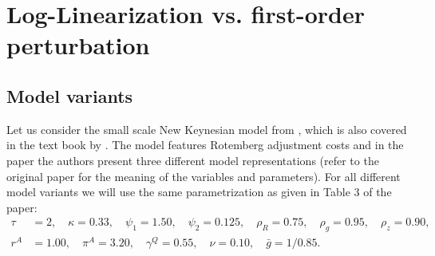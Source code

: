 \section{Log-Linearization vs. first-order perturbation\label{ex:LogLinearization}}

\subsection*{Model variants}
Let us consider the small scale New Keynesian model from \textcite{An.Schorfheide_2007_BayesianAnalysisDSGE},
  which is also covered in the text book by \textcite{Herbst.Schorfheide_2016_BayesianEstimationDSGE}.
The model features Rotemberg adjustment costs and in the paper the authors present three different model representations
  (refer to the original paper for the meaning of the variables and parameters).
For all different model variants we will use the same parametrization as given in Table 3 of the paper:
\begin{align*}
\tau&=2, \quad
\kappa=0.33, \quad
\psi_1 = 1.50, \quad
\psi_2  = 0.125, \quad
\rho_R  = 0.75, \quad
\rho_g  = 0.95, \quad
\rho_z  = 0.90,\\
r^A  &= 1.00, \quad
\pi^A = 3.20, \quad
\gamma^Q = 0.55, \quad
\nu = 0.10, \quad
\bar{g} = 1/0.85.
\end{align*}

